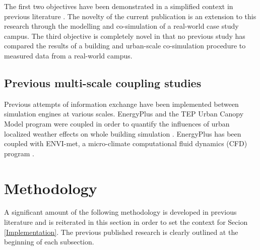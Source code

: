 \documentclass{tBPS2e}
\theoremstyle{plain}
\theoremstyle{definition}
\theoremstyle{remark}
\begin{document}
The first two objectives have been demonstrated in a simplified context in previous literature \citep{thomas2014multiscale,Miller:2015vk}. The novelty of the current publication is an extension to this research through the modelling and co-simulation of a real-world case study campus. The third objective is completely novel in that no previous study has compared the results of a building and urban-scale co-simulation procedure to measured data from a real-world campus. 

\subsection{Previous multi-scale coupling studies}
Previous attempts of information exchange have been implemented between simulation engines at various scales. EnergyPlus and the TEP Urban Canopy Model program were coupled in order to quantify the influences of urban localized weather effects on whole building simulation \citep{Bueno:2011hi}. EnergyPlus has been coupled with ENVI-met, a micro-climate computational fluid dynamics (CFD) program
\citep{Yang:2012cr}.

\section{Methodology}\label{Methodology}
A significant amount of the following methodology is developed in previous literature and is reiterated in this section in order to set the context for Secion \ref{Implementation}. The previous published research is clearly outlined at the beginning of each subsection.
\end{document}
